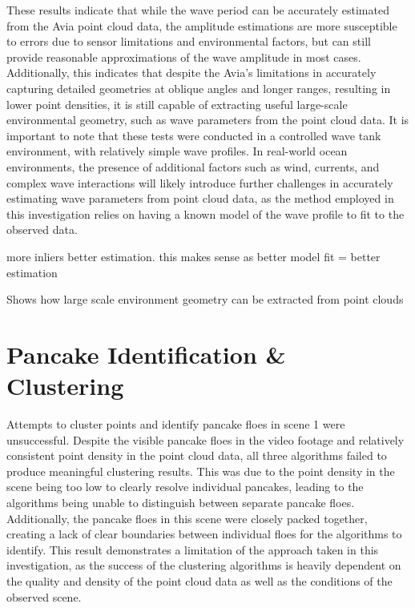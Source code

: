 These results indicate that while the wave period can be accurately estimated from the Avia point cloud data, the amplitude estimations are more susceptible to errors due to sensor limitations and environmental factors, but can still provide reasonable approximations of the wave amplitude in most cases. Additionally, this indicates that despite the Avia's limitations in accurately capturing detailed geometries at oblique angles and longer ranges, resulting in lower point densities, it is still capable of extracting useful large-scale environmental geometry, such as wave parameters from the point cloud data. It is important to note that these tests were conducted in a controlled wave tank environment, with relatively simple wave profiles. In real-world ocean environments, the presence of additional factors such as wind, currents, and complex wave interactions will likely introduce further challenges in accurately estimating wave parameters from point cloud data, as the method employed in this investigation relies on having a known model of the wave profile to fit to the observed data. 

more inliers \> better estimation. this makes sense as better model fit = better estimation

Shows how large scale environment geometry can be extracted from point clouds

\section{Pancake Identification \& Clustering}
\label{sec:ch8.section4}

Attempts to cluster points and identify pancake floes in scene 1 were unsuccessful. Despite the visible pancake floes in the video footage and relatively consistent point density in the point cloud data, all three algorithms failed to produce meaningful clustering results. This was due to the point density in the scene being too low to clearly resolve individual pancakes, leading to the algorithms being unable to distinguish between separate pancake floes. Additionally, the pancake floes in this scene were closely packed together, creating a lack of clear boundaries between individual floes for the algorithms to identify. This result demonstrates a limitation of the approach taken in this investigation, as the success of the clustering algorithms is heavily dependent on the quality and density of the point cloud data as well as the conditions of the observed scene.


